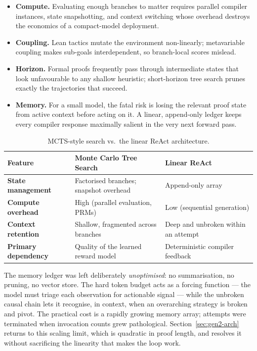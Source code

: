 \documentclass[12pt, a4paper]{article}
\begin{document}
\begin{itemize}[leftmargin=*]
  \item \textbf{Compute.} Evaluating enough branches to matter requires
    parallel compiler instances, state snapshotting, and context switching
    whose overhead destroys the economics of a compact-model deployment.
  \item \textbf{Coupling.} Lean tactics mutate the environment non-linearly;
    metavariable coupling makes sub-goals interdependent, so branch-local
    scores mislead.
  \item \textbf{Horizon.} Formal proofs frequently pass through intermediate
    states that look unfavourable to any shallow heuristic; short-horizon
    tree search prunes exactly the trajectories that succeed.
  \item \textbf{Memory.} For a small model, the fatal risk is losing the
    relevant proof state from active context before acting on it. A linear,
    append-only ledger keeps every compiler response maximally salient in
    the very next forward pass.
\end{itemize}

\begin{table}[H]
  \centering
  \caption{MCTS-style search vs.\ the linear ReAct architecture.}
  \label{tab:mcts_vs_react}
  \renewcommand{\arraystretch}{1.4}
  \begin{tabular}{>{\bfseries}p{3.4cm} p{5.6cm} p{5.6cm}}
    \toprule
    Feature & Monte Carlo Tree Search & Linear ReAct \\
    \midrule
    State management & Factorised branches; snapshot overhead & Append-only array \\
    Compute overhead & High (parallel evaluation, PRMs) & Low (sequential generation) \\
    Context retention & Shallow, fragmented across branches & Deep and unbroken within an attempt \\
    Primary dependency & Quality of the learned reward model & Deterministic compiler feedback \\
    \bottomrule
  \end{tabular}
\end{table}

The memory ledger was left deliberately \emph{unoptimised}: no summarisation,
no pruning, no vector store. The hard token budget acts as a forcing
function --- the model must triage each observation for actionable signal ---
while the unbroken causal chain lets it recognise, in context, when an
overarching strategy is broken and pivot. The practical cost is a rapidly
growing memory array; attempts were terminated when invocation counts grew
pathological. Section~\ref{sec:gen2-arch} returns to this scaling limit,
which is quadratic in proof length, and resolves it without sacrificing the
linearity that makes the loop work.
\end{document}
